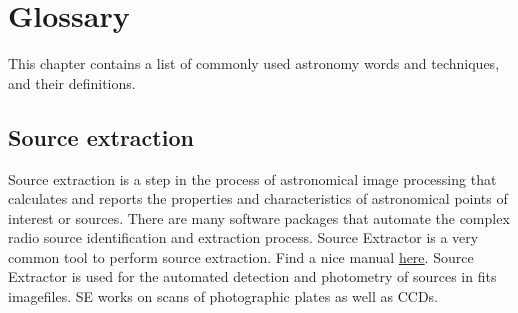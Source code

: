 \chapter{Glossary}

This chapter contains a list of commonly used astronomy words and techniques, and their definitions.

\section{Source extraction}
Source extraction is a step in the process of astronomical image processing that calculates and reports the properties and characteristics of astronomical points of interest or sources. There are many software packages that automate the complex radio source identification and extraction process. Source Extractor is a very common tool to perform source extraction. Find a nice manual \textcolor{blue}{\href{http://star-www.dur.ac.uk/~pdraper/extractor/Guide2source_extractor.pdf}{here}}. Source Extractor is used for the automated detection and photometry of sources in fits imagefiles. SE works on scans of photographic plates as well as CCDs. 

